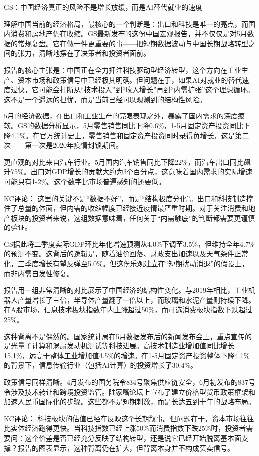 \documentclass[11pt]{ctexart}
\begin{document}
GS：中国经济真正的风险不是增长放缓，而是AI替代就业的速度

理解中国当前的经济格局，最核心的一个判断是：出口和科技是唯一的亮点，而国内消费和房地产仍在收缩。GS最新发布的这份中国宏观报告，并不仅仅是对5月数据的常规复盘。它在做一件更重要的事——把短期数据波动与中国长期战略转型之间的张力，清晰地摆在了决策者和投资者面前。

报告的核心主张是：中国正在全力押注科技驱动型经济转型，这个方向在工业生产、资本市场和政策信号中已经极其明确。但问题在于，如果AI对就业的替代速度过快，它可能会打断从“技术投入”到“收入增长”再到“内需扩张”这个理想循环。这不是一个遥远的担忧，而是当前已经可以观测到的结构性风险。

5月的经济数据，在出口和工业生产的亮眼表现之外，暴露了国内需求的深度疲软。GS的数据分析显示，5月零售销售同比下降0.6\%，1-5月固定资产投资同比下降4.1\%。在官方统计史上，零售销售和固定资产投资同时录得负增长，这是第二次——第一次是2020年疫情封锁期间。

更直观的对比来自汽车行业。5月国内汽车销售同比下降22\%，而汽车出口同比飙升75\%。出口对GDP增长的贡献大约为3个百分点，这意味着国内需求的实际增速可能只有1-2\%。这个数字比市场普遍感知的还要低。

KC评论： 这里的关键不是“数据不好”，而是“结构极度分化”。出口和科技制造撑住了总量的体面，但内需的收缩幅度已经接近疫情最严重时期。对于关注消费和地产板块的投资者来说，这组数据意味着，任何关于“内需触底”的判断都需要更谨慎的验证。

GS据此将二季度实际GDP环比年化增速预测从4.0\%下调至3.5\%，但维持全年4.7\%的预测不变。这背后的逻辑是，随着油价回落、财政支出加速以及天气条件正常化，三季度增长有望反弹至5.0\%。但这份乐观建立在“短期扰动消退”的假设上，而非内需自发性修复。

报告用一组非常清晰的对比展示了中国经济的结构性变化。与2019年相比，工业机器人产量增长了三倍，半导体产量翻了一倍以上，而玻璃和水泥产量则持续下降。在A股市场，信息技术板块指数年内上涨超过50\%，而可选消费板块指数下跌超过25\%。

这种背离不是偶然的。国家统计局在5月数据发布后的新闻发布会上，重点宣传的是光量子计算和涡扇发动机测试等科技进展。高技术制造业增加值同比增长15.1\%，远高于整体工业增加值4.5\%的增速。在1-5月固定资产投资整体下降4.1\%的背景下，信息传输行业（包括AI计算）的投资增长了30.4\%。

政策信号同样清晰。4月发布的国务院令834号聚焦供应链安全，6月初发布的837号令涉及技术转让和跨境投资监管。陆家嘴论坛上宣布了建立价格型货币政策框架和加速人民币国际化的步骤。这些都不是短期刺激，而是长达五到十年的战略布局。

KC评论： 科技板块的估值已经在反映这个长期叙事。但问题在于，资本市场往往比实体经济跑得更快。当科技指数已经上涨50\%而消费指数下跌25\%时，投资者需要问：这个价差是否已经充分反映了结构转型，还是说它已经开始脱离基本面支撑？报告的图表显示，这种背离仍在扩大，但背离本身并不构成买卖信号。
\end{document}
